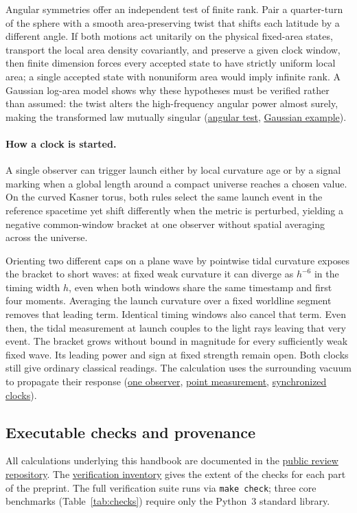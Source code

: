 \documentclass[10pt,a4paper]{article}
\newcommand{\repo}[2]{\href{https://github.com/sprajs/quantum-gravity/blob/main/#1}{#2}}
\begin{document}
Angular symmetries offer an independent test of finite rank. Pair a quarter-turn of the sphere with a smooth area-preserving twist that shifts each latitude by a different angle. If both motions act unitarily on the physical fixed-area states, transport the local area density covariantly, and preserve a given clock window, then finite dimension forces every accepted state to have strictly uniform local area; a single accepted state with nonuniform area would imply infinite rank. A Gaussian log-area model shows why these hypotheses must be verified rather than assumed: the twist alters the high-frequency angular power almost surely, making the transformed law mutually singular (\repo{audit/rank-symmetry.md}{angular test}, \repo{audit/angular-gaussian.md}{Gaussian example}).

\paragraph{How a clock is started.} A single observer can trigger launch either by local curvature age or by a signal marking when a global length around a compact universe reaches a chosen value. On the curved Kasner torus, both rules select the same launch event in the reference spacetime yet shift differently when the metric is perturbed, yielding a negative common-window bracket at one observer without spatial averaging across the universe.

Orienting two different caps on a plane wave by pointwise tidal curvature exposes the bracket to short waves: at fixed weak curvature it can diverge as $h^{-6}$ in the timing width $h$, even when both windows share the same timestamp and first four moments. Averaging the launch curvature over a fixed worldline segment removes that leading term. Identical timing windows also cancel that term. Even then, the tidal measurement at launch couples to the light rays leaving that very event. The bracket grows without bound in magnitude for every sufficiently weak fixed wave. Its leading power and sign at fixed strength remain open. Both clocks still give ordinary classical readings. The calculation uses the surrounding vacuum to propagate their response (\repo{audit/local-clock-control.md}{one observer}, \repo{audit/local-curved-bracket.md}{point measurement}, \repo{audit/fixed-strength-contact.md}{synchronized clocks}).

\clearpage

\subsection{Executable checks and provenance}
All calculations underlying this handbook are documented in the \href{https://github.com/sprajs/quantum-gravity}{public review repository}. The \repo{audit/verification-scope.md}{verification inventory} gives the extent of the checks for each part of the preprint. The full verification suite runs via \texttt{make check}; three core benchmarks (Table~\ref{tab:checks}) require only the Python~3 standard library.
\end{document}
